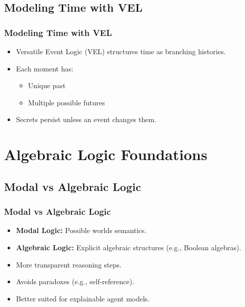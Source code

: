 \documentclass[aspectratio=169]{beamer}
\begin{document}
\subsection{Modeling Time with VEL}
\begin{frame}
\frametitle{Modeling Time with VEL}
\Large
\begin{itemize}
    \item Versatile Event Logic (VEL) structures time as branching histories.
    \item Each moment has:
    \begin{itemize}
        \Large
        \item Unique past
        \item Multiple possible futures
    \end{itemize}
    \item Secrets persist unless an event changes them.
\end{itemize}
\end{frame}


\section{Algebraic Logic Foundations}

\subsection{Modal vs Algebraic Logic}
\begin{frame}
\frametitle{Modal vs Algebraic Logic}
\Large
\begin{itemize}
    \item \textbf{Modal Logic:} Possible worlds semantics.
    \item \textbf{Algebraic Logic:} Explicit algebraic structures (e.g., Boolean algebras).
    \item More transparent reasoning steps.
    \item Avoids paradoxes (e.g., self-reference).
    \item Better suited for explainable agent models.
\end{itemize}
\end{frame}
\end{document}
